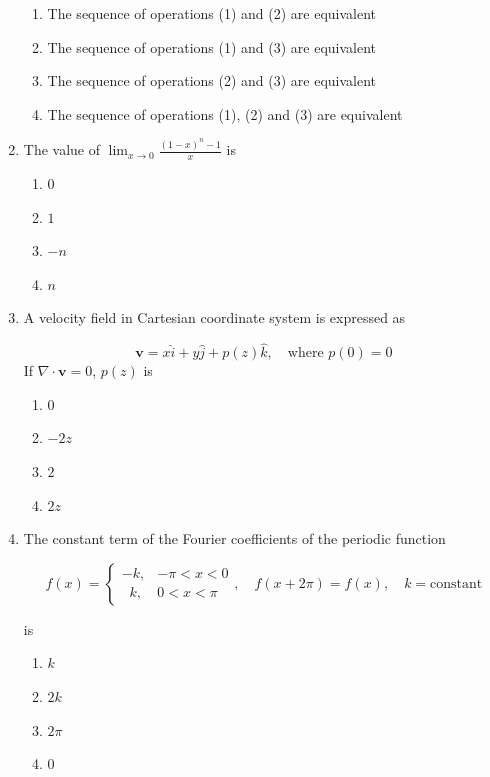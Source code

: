 \documentclass[journal,12pt,onecolumn]{IEEEtran}
\theoremstyle{remark}
\begin{document}
\begin{enumerate}
\hfill{}
\begin{multicols}{2}
\begin{enumerate}
\item The sequence of operations (1) and (2) are equivalent
\item The sequence of operations (1) and (3) are equivalent 
\item The sequence of operations (2) and (3) are equivalent
\item The sequence of operations (1), (2) and (3) are equivalent 
\end{enumerate}
\end{multicols}
\item The value of $\lim_{x \to 0} \frac{(1-x)^n - 1}{x}$ is 

\hfill{}
\begin{multicols}{4}
\begin{enumerate}
\item $0$
\item $1$
\item $-n$
\item $n$
\end{enumerate}
\end{multicols}
\item A velocity field in Cartesian coordinate system is expressed as  

\[
\mathbf{v} = x \hat{i} + y \hat{j} + p(z)\hat{k}, \quad \text{where } p(0) = 0
\]  
If $\nabla \cdot \mathbf{v} = 0$, $p(z)$ is

\hfill{}
\begin{multicols}{2}
\begin{enumerate}
\item $0$
\item $-2z$
\item $2$
\item $2z$
\end{enumerate}
\end{multicols}
\item The constant term of the Fourier coefficients of the periodic function  

\[
f(x) = 
\begin{cases}
 -k, & -\pi < x < 0 \\[6pt]
 \;\;k, & 0 < x < \pi
\end{cases}, 
\quad f(x+2\pi) = f(x), \quad k = \text{constant}
\]

is  

\hfill{}
\begin{multicols}{2}
\begin{enumerate}
  \item $k$
  \item $2k$
  \item $2\pi$
  \item $0$
\end{enumerate}
\end{multicols}


\end{enumerate}
\end{document}
